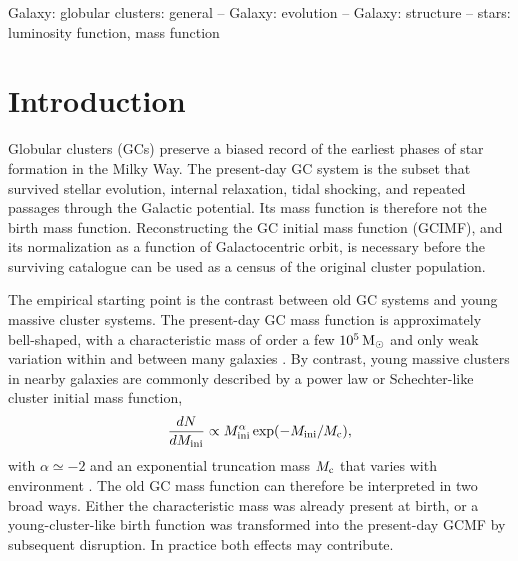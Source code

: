 \documentclass[fleqn,usenatbib]{mnras}
\begin{document}
\begin{keywords}
Galaxy: globular clusters: general -- Galaxy: evolution -- Galaxy: structure -- stars: luminosity function, mass function
\end{keywords}

\section{Introduction}\label{sec:intro}
Globular clusters (GCs) preserve a biased record of the earliest phases of star formation in the Milky Way. The present-day GC system is the subset that survived stellar evolution, internal relaxation, tidal shocking, and repeated passages through the Galactic potential. Its mass function is therefore not the birth mass function. Reconstructing the GC initial mass function (GCIMF), and its normalization as a function of Galactocentric orbit, is necessary before the surviving catalogue can be used as a census of the original cluster population.

The empirical starting point is the contrast between old GC systems and young massive cluster systems. The present-day GC mass function is approximately bell-shaped, with a characteristic mass of order a few $10^5\,{\rm M}_\odot$ and only weak variation within and between many galaxies \citep[e.g.][]{Harris1991,McLaughlinPudritz1996,Jordan2007}. By contrast, young massive clusters in nearby galaxies are commonly described by a power law or Schechter-like cluster initial mass function,
\begin{equation}
\frac{dN}{dM_{\rm ini}} \propto
M_{\rm ini}^{\alpha}
\exp(-M_{\rm ini}/M_{\rm c}),
\end{equation}
with $\alpha\simeq -2$ and an exponential truncation mass $M_{\rm c}$ that varies with environment \citep[e.g.][]{Schechter1976,Larsen2009,Johnson2017,Mok2019}. The old GC mass function can therefore be interpreted in two broad ways. Either the characteristic mass was already present at birth, or a young-cluster-like birth function was transformed into the present-day GCMF by subsequent disruption. In practice both effects may contribute.
\end{document}
